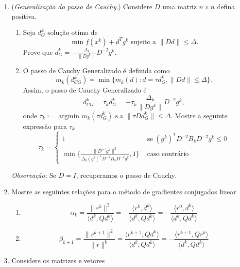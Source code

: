 \documentclass[a4paper,latin]{article}
\begin{document}
\begin{enumerate}
    \item ({\it Generalização do passo de Cauchy}.) Considere 
    $D$ uma matriz $n \times n$ defina positiva.
      \begin{enumerate}
      	\item Seja $d_{G}^{k}$ solução otima de 
      	$$ \text{ min } f(x^k)+ d^{T}g^{k} 
      	   \text{ sujeito a } \|Dd\|\leq \Delta. $$
      	   Prove que $d_{G}^{k}= -\frac{\Delta_k}{\|Dg^{k}\|} D^{-2}g^{k}$.
      	\item O passo de Cauchy Generalizado é definida como
      	$$ m_{k}(d_{CG}^{k})= \min \{ m_{k}(d): 
      	                      d=\tau d_{G}^{k}, \|D d\|\leq \Delta  
      	                      \}. $$
      	Assim, o passo de Cauchy Generalizado é
      	$$  d_{CG}^{k}=\tau_{k}d_{G}^{k}=-\tau_k \frac{\Delta_k}{\|Dg^{k}\|} D^{-2}g^{k},  $$                        
      	onde $\tau_{k}:=\text{ argmin } 
      	m_{k}(\tau d_{G}^{k}) \text{ s.a } \|\tau Dd_{G}^{k}\|\leq \Delta$.
      	Mostre a seguinte expressão para $\tau_{k}$
      	  $$
      	  \tau_{k}=
      	  \left\{
      	  \begin{matrix}
      	  1 & \text{ se } (g^{k})^{T}D^{-2}B_{k}D^{-2}g^{k}\leq 0 \\
      	  \min  \{ \frac{\|D^{-1}g^{k}\|^{3}}{\Delta_{k}(g^{k})^{T}D^{-2}B_{k}D^{-2}g^{k}}, 1\} & \text{ caso contrário }
      	  \end{matrix}
      	  \right.	  
      	  $$ 
      \end{enumerate}
        {\it Observação: } Se $D=I$, recuperamos o passo de Cauchy.	  
     \item Mostre as seguintes relações para o método de gradientes conjugados linear
    \begin{enumerate}
    	\item 
    	$$\alpha_{k}=
    	\frac{\|r^{k}\|^{2}}{\langle d^{k},Qd^{k}\rangle}=
    	-\frac{\langle r^{k},d^{k}\rangle}{\langle d^{k}, Qd^{k}\rangle}=
    	-\frac{\langle r^{0},d^{k}\rangle}{\langle d^{k}, Qd^{k}\rangle}$$
    	\item  
    	$$\beta_{k+1}=
    	\frac{\|r^{k+1}\|^{2}}{\|r\|^{k}}=
    	\frac{\langle r^{k+1},Qd^{k}\rangle}{\langle d^{k}, Qd^{k}\rangle}=
    	-\frac{\langle r^{k+1},Qr^{k}\rangle}{\langle d^{k}, Qd^{k}\rangle}$$
    \end{enumerate}    
    \item Considere os matrizes e vetores 
      

\end{enumerate}
\end{document}
